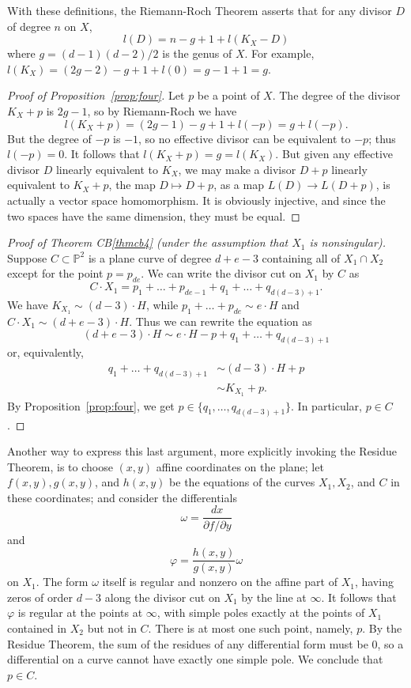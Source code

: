 \documentclass{bull-l}
\theoremstyle{pplain}
\theoremstyle{definition}
\begin{document}
With these definitions, the Riemann-Roch Theorem asserts that for any
divisor $D$ of degree $n$ on $X$,
\[l(D)=n-g+1+l(K_X-D)\]
where $g=(d-1)(d-2)/2$ is the genus of  $X$.  For example,
$l(K_X)=(2g-2)-g+1+l(0)=g-1+1=g$.

\begin{proof}[Proof of Proposition~\ref{prop:four}]
Let $p$ be a point of $X$.  The degree of the divisor $K_X+p$ is $2g-1$, so by 
Riemann-Roch we have 
\[l(K_X+p)=(2g-1)-g+1+l(-p)=g+l(-p).\]
But the degree of $-p$ is $-1$, so no effective divisor can be equivalent to
$-p$; thus $l(-p)=0$.  It follows that $l(K_X+p)=g=l(K_X)$.  But given any
effective divisor $D$ linearly equivalent to $K_X$, we may make a divisor $D+p$ 
linearly equivalent to $K_X+p$, the map $D\mapsto D+p$, as a map  $L(D)\to
L(D+p)$, is actually a vector space homomorphism.  It is obviously injective,
and since the two spaces have the same dimension, they must be equal.
\end{proof}

\begin{proof}[Proof of Theorem \rm CB\ref{thmcb4} 
(under the assumption  that
$X_1$ is nonsingular)]\hspace{\fill}Suppose\linebreak  
$C\subset \mathbb{P}^2$ is a plane curve of degree $d+e-3$ containing
all of $X_1\cap  X_2$ except for the point $p=p_{de}$.  We can write the
divisor cut on $X_1$ by $C$ as
\[C\cdot X_1=p_1+\dots+p_{de-1}+q_1+\dots+q_{d(d-3)+1}.\]
We have $K_{X_1}\sim (d-3)\cdot H$, while $p_1+\dots+p_{de}\sim e\cdot H$ and
$C\cdot X_1\sim (d+e-3)\cdot H$.  Thus we can rewrite the equation as
\[(d+e-3)\cdot H\sim e\cdot H-p+q_1+\dots+q_{d(d-3)+1}\]
or, equivalently,
\begin{equation*} 
\begin{split}
q_1+\dots +q_{d(d-3)+1}&\sim (d-3)\cdot H+p\\
&\sim K_{X_1}+p.
\end{split}
\end{equation*} 
By Proposition~\ref{prop:four}, we get $p\in\{q_1,\dots,q_{d(d-3)+1}\}$.  In
particular, $p\in C$.
\end{proof}

Another way to express this last argument, more explicitly invoking  the
Residue Theorem, is to choose $(x,y)$ affine coordinates on the plane; let
$f(x,y),g(x,y)$, and $h(x,y)$ be the equations of the curves $X_1,X_2$, and $C$
in these coordinates; and consider the differentials
\[\omega=\frac {dx}{\partial f/\partial y}\]
and
\[\varphi=\frac{h(x,y)} {g(x,y)}\omega\]
on $X_1$. The form 
$\omega$ itself is regular and nonzero on the affine part of $X_1$,
having zeros of order $d-3$ along the divisor cut on $X_1$ by the line at
$\infty$.  It follows that $\varphi$ is regular at the points at $\infty$, with
simple poles exactly at the points of $X_1$ contained in $X_2$ but not in $C$. 
There is at most one such point, namely, $p$.  By the Residue Theorem, the sum
of the residues of any differential form must be 0, so a differential on a
curve cannot have exactly one simple pole.  We conclude that $p\in C$.
\end{document}
